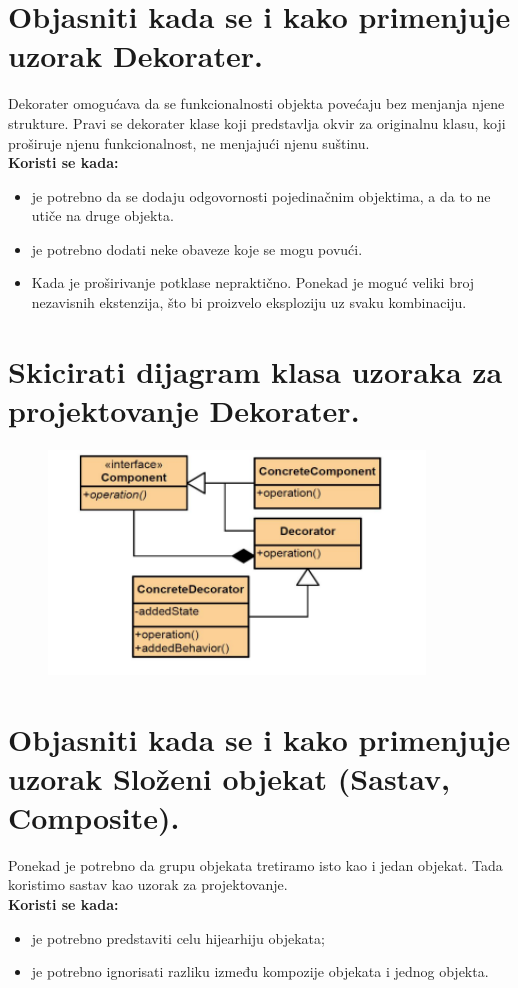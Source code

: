 \documentclass[a4paper]{article}
\begin{document}
\section{Objasniti kada se i kako primenjuje uzorak Dekorater.}
  Dekorater omogućava da se funkcionalnosti objekta povećaju bez menjanja njene strukture. Pravi se
  dekorater klase koji predstavlja okvir za originalnu klasu, koji proširuje njenu funkcionalnost,
  ne menjajući njenu suštinu. \\
  \textbf{Koristi se kada:}
  \begin{itemize}
    \item je potrebno da se dodaju odgovornosti pojedinačnim objektima, 
          a da to ne utiče na druge objekta.
    \item je potrebno dodati neke obaveze koje se mogu povući.
    \item Kada je proširivanje potklase nepraktično. Ponekad je moguć veliki broj nezavisnih
          ekstenzija, što bi proizvelo eksploziju uz svaku kombinaciju.
  \end{itemize}
  
\section{Skicirati dijagram klasa uzoraka za projektovanje Dekorater.}
  \begin{figure}[H]
    \begin{center}
        \includegraphics[width=100mm,height=60mm]{Slike/dp_decorator.png}
    \end{center}
  \end{figure} 

\section{Objasniti kada se i kako primenjuje uzorak Složeni objekat (Sastav, Composite).}
  Ponekad je potrebno da grupu objekata tretiramo isto kao i jedan objekat. Tada koristimo sastav
  kao uzorak za projektovanje. \\
  \textbf{Koristi se kada:}
  \begin{itemize}
    \item je potrebno predstaviti celu hijearhiju objekata;
    \item je potrebno ignorisati razliku između kompozije objekata i jednog objekta.
  \end{itemize}
\end{document}
